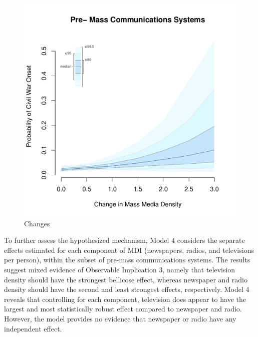 \documentclass[11pt,article,oneside]{memoir}
\makeatletter
\def\maxwidth{\ifdim\Gin@nat@width>\linewidth\linewidth
\else\Gin@nat@width\fi}
\let\Oldincludegraphics\includegraphics
\renewcommand{\includegraphics}[1]{\Oldincludegraphics[width=\maxwidth]{#1}}
\makeatother
\begin{document}
\clearpage

\begin{figure} 
\includegraphics{figure/d_mdi_effect.pdf} 
\caption{Changes} 
\label{myFigz} 
\end{figure}

To further assess the hypothesized mechanism, Model 4 considers the
separate effects estimated for each component of MDI (newspapers,
radios, and televisions per person), within the subset of pre-mass
communications systems. The results suggest mixed evidence of Observable
Implication 3, namely that television density should have the strongest
bellicose effect, whereas newspaper and radio density should have the
second and least strongest effects, respectively. Model 4 reveals that
controlling for each component, television does appear to have the
largest and most statistically robust effect compared to newspaper and
radio. However, the model provides no evidence that newspaper or radio
have any independent effect.
\end{document}
